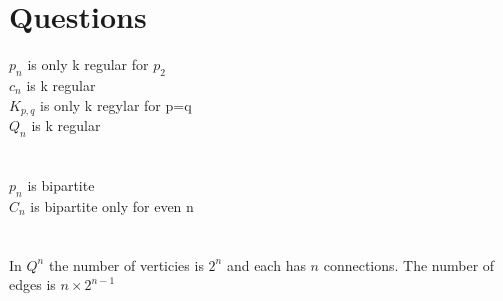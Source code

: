 \documentclass{article}[18pt]
\begin{document}
\section{Questions}
$p_n$ is only k regular for $p_2$\\
$c_n$ is k regular\\
$K_{p,q}$ is only k regylar for p=q\\
$Q_n$ is k regular\\
\\
\\
$p_n$ is bipartite\\
$C_n$ is bipartite only for even n\\
\\
\\
In $Q^n$ the number of verticies is $2^n$ and each has $n$ connections. The number of edges is $n\times 2^{n-1}$
\end{document}
